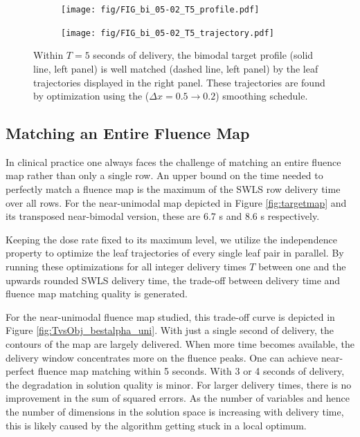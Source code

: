 \documentclass{iopart}
\begin{document}
\begin{figure}[h]
  \centering
  \begin{subfigure}[b]{0.5\linewidth}
    \centering\texttt{[image: fig/FIG\_bi\_05-02\_T5\_profile.pdf]}
    \caption{\label{fig:sps_bmt_prof}}
  \end{subfigure}%
  \begin{subfigure}[b]{0.5\linewidth}
    \centering\texttt{[image: fig/FIG\_bi\_05-02\_T5\_trajectory.pdf]}
    \caption{\label{fig:sps_bmt_traj}}
  \end{subfigure}
  \caption{Within $T=5$ seconds of delivery, the bimodal target profile (solid line, left panel) is well matched (dashed line, left panel) by the leaf trajectories displayed in the right panel. These trajectories are found by optimization using the ($\Delta x = 0.5 \to 0.2$) smoothing schedule.}
  \label{fig:smoothingParamSweep_bimodalTraj}
\end{figure}

\subsection{Matching an Entire Fluence Map}
In clinical practice one always faces the challenge of matching an entire fluence map rather than only a single row. An upper bound on the time needed to perfectly match a fluence map is the maximum of the SWLS row delivery time over all rows. For the near-unimodal map depicted in Figure \ref{fig:targetmap} and its transposed near-bimodal version, these are 6.7 s and 8.6 s respectively.

Keeping the dose rate fixed to its maximum level, we utilize the independence property to optimize the leaf trajectories of every single leaf pair in parallel. By running these optimizations for all integer delivery times $T$ between one and the upwards rounded SWLS delivery time, the trade-off between delivery time and fluence map matching quality is generated. 

For the near-unimodal fluence map studied, this trade-off curve is depicted in Figure \ref{fig:TvsObj_bestalpha_uni}. With just a single second of delivery, the contours of the map are largely delivered. When more time becomes available, the delivery window concentrates more on the fluence peaks.
One can achieve near-perfect fluence map matching within 5 seconds. With 3 or 4 seconds of delivery, the degradation in solution quality is minor. For larger delivery times, there is no improvement in the sum of squared errors. As the number of variables and hence the number of dimensions in the solution space is increasing with delivery time, this is likely caused by the algorithm getting stuck in a local optimum. 
\end{document}
